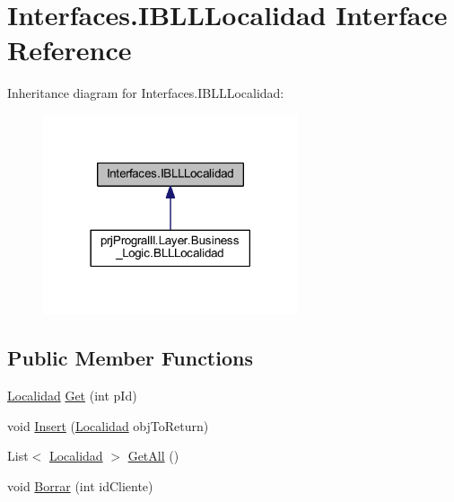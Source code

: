 \hypertarget{interface_interfaces_1_1_i_b_l_l_localidad}{}\section{Interfaces.\+I\+B\+L\+L\+Localidad Interface Reference}
\label{interface_interfaces_1_1_i_b_l_l_localidad}


Inheritance diagram for Interfaces.\+I\+B\+L\+L\+Localidad\+:
\nopagebreak
\begin{figure}[H]
\begin{center}
\leavevmode
\includegraphics[width=213pt]{interface_interfaces_1_1_i_b_l_l_localidad__inherit__graph}
\end{center}
\end{figure}
\subsection*{Public Member Functions}
\begin{DoxyCompactItemize}
\item 
\hyperlink{classprj_progra_i_i_i_1_1_layer_1_1_entities_1_1_localidad}{Localidad} \hyperlink{interface_interfaces_1_1_i_b_l_l_localidad_a988cb353619c30e2ec9453e8f027a8b0}{Get} (int p\+Id)
\item 
void \hyperlink{interface_interfaces_1_1_i_b_l_l_localidad_a7bd5604308ad6d5a277cc70207125274}{Insert} (\hyperlink{classprj_progra_i_i_i_1_1_layer_1_1_entities_1_1_localidad}{Localidad} obj\+To\+Return)
\item 
List$<$ \hyperlink{classprj_progra_i_i_i_1_1_layer_1_1_entities_1_1_localidad}{Localidad} $>$ \hyperlink{interface_interfaces_1_1_i_b_l_l_localidad_afc2e7478f3ffcee4730c47a9cfb0cfca}{Get\+All} ()
\item 
void \hyperlink{interface_interfaces_1_1_i_b_l_l_localidad_aea523587dbbeda757d93e79f4207bcc2}{Borrar} (int id\+Cliente)
\end{DoxyCompactItemize}



